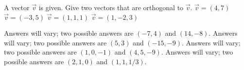 
\begin{Exercise}[
name={},
title={}, 
difficulty=0,
origin={\cite{GHC}}]
A vector $\vec v$ is given. Give two vectors that are orthogonal to $\vec v$.
\Question $\vec v = (4,7)$
\Question $\vec v = (-3,5)$
\Question $\vec v = (1,1,1)$
\Question $\vec v = (1,-2,3)$
\end{Exercise}

\begin{Answer}
\Question Answers will vary; two possible answers are $(-7,4)$ and $(14,-8)$.
\Question Answers will vary; two possible answers are $(5,3)$ and $(-15,-9)$.
\Question Answers will vary; two possible answers are $(1,0,-1)$ and $(4,5,-9)$.
\Question Answers will vary; two possible answers are $(2,1,0)$ and $(1,1,1/3)$.
\end{Answer}
